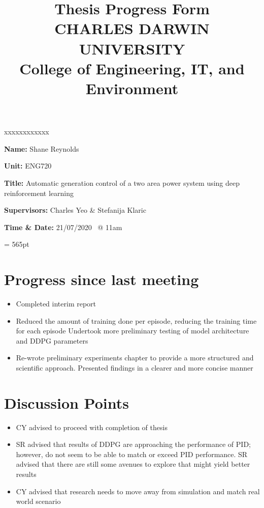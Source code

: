 \documentclass[12pt]{article}
\title{	
		Thesis Progress Form\\
		CHARLES DARWIN UNIVERSITY\\
		College of Engineering, IT, and Environment
	  }
\author{}
\date{}
\begin{document}
	
	\maketitle
	
	\begin{namelist}{xxxxxxxxxxxx}
		\item[{\bf Name:}]
			Shane Reynolds
		\item[{\bf Unit:}]
			ENG720
		\item[{\bf Title:}]
			Automatic generation control of a two area power system using deep reinforcement learning
		\item[{\bf Supervisors:}]
			Charles Yeo \& Stefanija Klaric
		\item[{\bf Time \& Date:} 21/07/2020 \ @ 11am]
			
	\end{namelist}
	
	\pagestyle{plain} %
	\textheight = 565pt %
	
	\section{Progress since last meeting}
	\begin{itemize}
		\item Completed interim report
		\item Reduced the amount of training done per episode, reducing the training time for each episode
		Undertook more preliminary testing of model architecture and DDPG parameters
		\item Re-wrote preliminary experiments chapter to provide a more structured and scientific approach. Presented findings in a clearer and more concise manner
	\end{itemize}
	\section{Discussion Points}
	\begin{itemize}
		\item CY advised to proceed with completion of thesis
		\item SR advised that results of DDPG are approaching the performance of PID; however, do not seem to be able to match or exceed PID performance. SR advised that there are still some avenues to explore that might yield better results
		\item CY advised that research needs to move away from simulation and match real world scenario
	\end{itemize}
\end{document}
